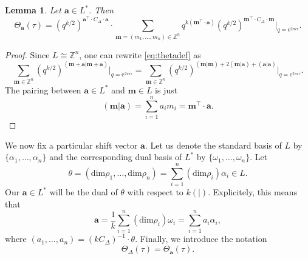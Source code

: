 \documentclass[11pt,a4paper]{amsart}
\newtheorem{lemma}[theorem]{Lemma}
\theoremstyle{definition}
\newcommand{\SZ}{\mathbb{Z}}                    %
\begin{document}
\begin{lemma} Let $\mathbf{a} \in L^{\ast}$. Then
\[
\Theta_{\mathbf{a}}(\tau)= (q^{k/2})^{\mathbf{a}^\top \cdot C_\Delta \cdot \mathbf{a}} \cdot \sum_{ \mathbf{m}=(m_1,\dots,m_n) \in \SZ^n } q^{ k(\mathbf{m}^\top \cdot \mathbf{a}) } (q^{k/2})^{\mathbf{m}^\top \cdot C_\Delta \cdot \mathbf{m}} \Big|_{q=\mathrm{e}^{2 \pi i \tau}}.\]
\label{lem:thetadef2}
\end{lemma}
\begin{proof}
Since $L \cong \SZ^n $, one can rewrite \eqref{eq:thetadef}
as
\[ \sum_{\mathbf{m} \in \SZ^n} (q^{k/2})^{(\mathbf{m+\mathbf{a}} | \mathbf{m+\mathbf{a}})} \Big|_{q=\mathrm{e}^{2 \pi i \tau}}=
\sum_{\mathbf{m} \in \SZ^n} (q^{k/2})^{(\mathbf{m}| \mathbf{m})+2(\mathbf{m}|\mathbf{a})+(\mathbf{a}|\mathbf{a})} \Big|_{q=\mathrm{e}^{2 \pi i \tau}}
.\]
The pairing between $\mathbf{a} \in L^{\ast}$ and $\mathbf{m} \in L$ is just \[(\mathbf{m}|\mathbf{a})=\sum_{i=1}^n a_i m_i = \mathbf{m}^\top \cdot \mathbf{a}.\]
\end{proof}







We now fix a particular shift vector $\mathbf{a}$. Let us denote the standard basis of $L$ by $\{\alpha_1, \dots, \alpha_n\}$ and the corresponding dual basis of $L^{\ast}$ by $\{\omega_1, \dots, \omega_n\}$.
Let
\begin{equation} 
\label{eq:thetadef}
\theta=( \mathrm{dim} \rho_1 ,\dots, \mathrm{dim} \rho_n) = \sum_{i=1}^n (\mathrm{dim} \rho_i) \alpha_i \in L.\end{equation}
Our $\mathbf{a} \in L^{\ast}$ will be the dual of $\theta$ with respect to $k(|)$. Explicitely, this means that
\begin{equation}\mathbf{a}= \frac{1}{k}\sum_{i=1}^n (\mathrm{dim} \rho_i) \omega_i=\sum_{i=1}^n a_i \alpha_i, 
\label{eq:zetasub}
\end{equation}
where $(a_1,\dots,a_n)=(kC_\Delta)^{-1} \cdot \theta$.
Finally, we introduce the notation
\[ \Theta_{\Delta}(\tau)=\Theta_{\mathbf{a}}(\tau). \]
\end{document}
